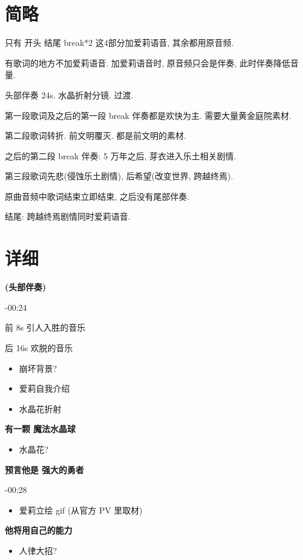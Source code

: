 \documentclass[a4paper]{article}
\begin{document}
\section{简略}

只有 开头 结尾 break*2 这4部分加爱莉语音, 其余都用原音频.

有歌词的地方不加爱莉语音. 加爱莉语音时, 原音频只会是伴奏, 此时伴奏降低音量.

头部伴奏 24s. 水晶折射分镜. 过渡.

第一段歌词及之后的第一段 break 伴奏都是欢快为主. 需要大量黄金庭院素材.

第二段歌词转折. 前文明覆灭. 都是前文明的素材.

之后的第二段 break 伴奏: 5 万年之后, 芽衣进入乐土相关剧情.

第三段歌词先悲(侵蚀乐土剧情), 后希望(改变世界, 跨越终焉).

原曲音频中歌词结束立即结束, 之后没有尾部伴奏.

结尾: 跨越终焉剧情同时爱莉语音.

\section{详细}

\textbf{(头部伴奏)}

-00:24

前 8s 引人入胜的音乐

后 16s 欢脱的音乐

\begin{itemize}
    \item 崩坏背景?
    \item 爱莉自我介绍
    \item 水晶花折射
\end{itemize}

\textbf{有一颗 魔法水晶球}

\begin{itemize}
    \item 水晶花?
\end{itemize}

\textbf{预言他是 强大的勇者}

-00:28

\begin{itemize}
    \item 爱莉立绘 gif (从官方 PV 里取材)
\end{itemize}

\textbf{他将用自己的能力}

\begin{itemize}
    \item 人律大招?
\end{itemize}
\end{document}
